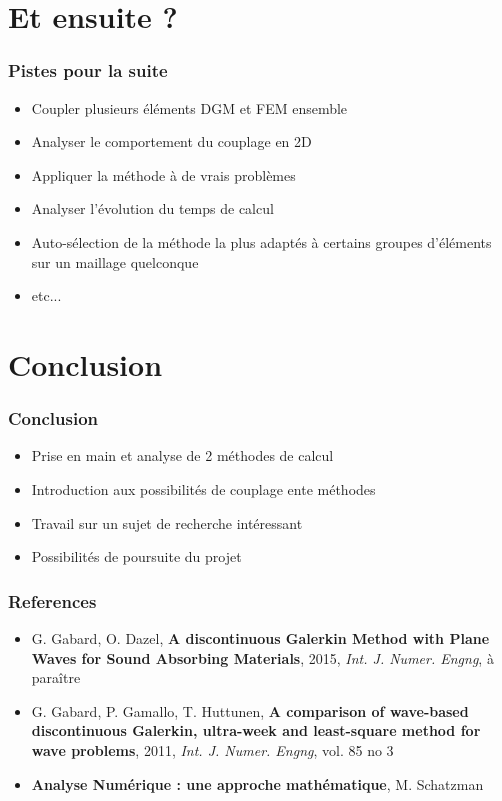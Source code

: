 \documentclass[10pt, compress]{beamer}
\begin{document}
\section{Et ensuite ?}

\begin{frame}
	\frametitle{Pistes pour la suite}

	\begin{itemize}
		\item Coupler plusieurs éléments DGM et FEM ensemble
		\item Analyser le comportement du couplage en 2D
		\item Appliquer la méthode à de vrais problèmes
		\item Analyser l'évolution du temps de calcul
		\item Auto-sélection de la méthode la plus adaptés à certains groupes d'éléments sur un maillage quelconque
		\item etc...
	\end{itemize}
\end{frame}

\section*{Conclusion}

\begin{frame}
	\frametitle{Conclusion}
	\begin{itemize}
		\item Prise en main et analyse de 2 méthodes de calcul
		\item Introduction aux possibilités de couplage ente méthodes
		\item Travail sur un sujet de recherche intéressant
		\item Possibilités de poursuite du projet
	\end{itemize}
\end{frame}

\begin{frame}
    \frametitle{References}

    \begin{itemize}
        \item  G. Gabard, O.  Dazel, \textbf{A discontinuous Galerkin Method with Plane Waves for Sound Absorbing
            Materials}, 2015, \textit{Int. J.  Numer. Engng}, à paraître
        \item  G. Gabard, P. Gamallo, T. Huttunen, \textbf{A comparison of wave-based discontinuous Galerkin, ultra-week
            and least-square method for wave problems}, 2011, \textit{Int. J.  Numer. Engng}, vol. 85 no 3
        \item \textbf{Analyse Numérique : une approche mathématique}, M. Schatzman
    \end{itemize}
\end{frame}

\end{document}
